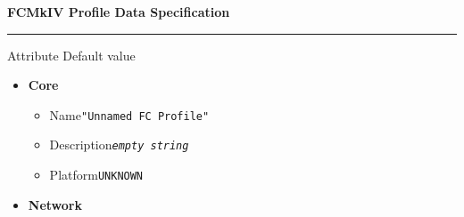 \documentclass{article}
\newcommand{\dt}[1]{\dotfill \texttt{#1}}
\newcommand{\vp}{\vspace{1em}}
\newcommand{\es}{\textit{empty string}}
\begin{document}
\textbf{\Large FCMkIV Profile Data Specification}
\vp

\hrule

\begin{multicols}{2}

\small

Attribute \hfill Default value

\begin{itemize}

\item \textbf{Core}

    \begin{itemize}
        \item Name\dt{"Unnamed FC Profile"}
        \item Description\dt{\es}
        \item Platform\dt{UNKNOWN}
    \end{itemize}

\item \textbf{Network}


\end{itemize}
\end{multicols}
\end{document}
